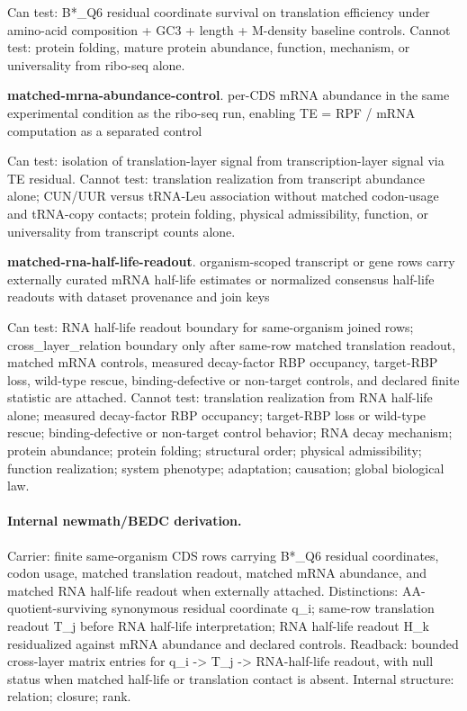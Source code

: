 Can test: B*\_Q6 residual coordinate survival on translation efficiency under amino-acid composition + GC3 + length + M-density baseline controls. Cannot test: protein folding, mature protein abundance, function, mechanism, or universality from ribo-seq alone.

\textbf{matched-mrna-abundance-control}. per-CDS mRNA abundance in the same experimental condition as the ribo-seq run, enabling TE = RPF / mRNA computation as a separated control

Can test: isolation of translation-layer signal from transcription-layer signal via TE residual. Cannot test: translation realization from transcript abundance alone; CUN/UUR versus tRNA-Leu association without matched codon-usage and tRNA-copy contacts; protein folding, physical admissibility, function, or universality from transcript counts alone.

\textbf{matched-rna-half-life-readout}. organism-scoped transcript or gene rows carry externally curated mRNA half-life estimates or normalized consensus half-life readouts with dataset provenance and join keys

Can test: RNA half-life readout boundary for same-organism joined rows; cross\_layer\_relation boundary only after same-row matched translation readout, matched mRNA controls, measured decay-factor RBP occupancy, target-RBP loss, wild-type rescue, binding-defective or non-target controls, and declared finite statistic are attached. Cannot test: translation realization from RNA half-life alone; measured decay-factor RBP occupancy; target-RBP loss or wild-type rescue; binding-defective or non-target control behavior; RNA decay mechanism; protein abundance; protein folding; structural order; physical admissibility; function realization; system phenotype; adaptation; causation; global biological law.

\paragraph{Internal newmath/BEDC derivation.} Carrier: finite same-organism CDS rows carrying B*\_Q6 residual coordinates, codon usage, matched translation readout, matched mRNA abundance, and matched RNA half-life readout when externally attached. Distinctions: AA-quotient-surviving synonymous residual coordinate q\_i; same-row translation readout T\_j before RNA half-life interpretation; RNA half-life readout H\_k residualized against mRNA abundance and declared controls. Readback: bounded cross-layer matrix entries for q\_i -> T\_j -> RNA-half-life readout, with null status when matched half-life or translation contact is absent. Internal structure: relation; closure; rank.

